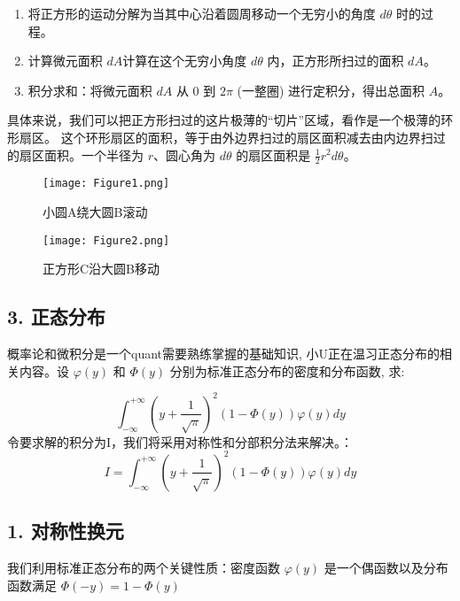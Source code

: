 \documentclass[UTF8]{ctexart}
\begin{document}
\begin{enumerate}
    \item 将正方形的运动分解为当其中心沿着圆周移动一个无穷小的角度 $d\theta$ 时的过程。
    \item 计算微元面积 $dA$计算在这个无穷小角度 $d\theta$ 内，正方形所扫过的面积 $dA$。
    \item 积分求和：将微元面积 $dA$ 从 $0$ 到 $2\pi$ (一整圈) 进行定积分，得出总面积 $A$。
\end{enumerate}
具体来说，我们可以把正方形扫过的这片极薄的“切片”区域，看作是一个极薄的环形扇区。
这个环形扇区的面积，等于由外边界扫过的扇区面积减去由内边界扫过的扇区面积。一个半径为 $r$、圆心角为 $d\theta$ 的扇区面积是 $\frac{1}{2}r^2 d\theta$。


\begin{figure}[h!]
    \centering
    \begin{minipage}{0.45\textwidth}
        \centering
        \texttt{[image: Figure1.png]} 
        \caption{小圆A绕大圆B滚动}
        \label{fig:fig1}
    \end{minipage}\hfill
    \begin{minipage}{0.45\textwidth}
        \centering
        \texttt{[image: Figure2.png]}
        \caption{正方形C沿大圆B移动}
        \label{fig:fig2}
    \end{minipage}
\end{figure}


\subsection*{3. 正态分布}
概率论和微积分是一个quant需要熟练掌握的基础知识, 小U正在温习正态分布的相关内容。设 $\varphi(y)$ 和 $\Phi(y)$ 分别为标准正态分布的密度和分布函数, 求:

$$\int_{-\infty}^{+\infty}{\left(y+\frac{1}{\sqrt{\pi}}\right)^{2}(1-\Phi(y))\varphi
  (y)dy}$$
令要求解的积分为I，我们将采用对称性和分部积分法来解决。：
$$ I = \int_{-\infty}^{+\infty}{\left(y+\frac{1}{\sqrt{\pi}}\right)^{2}(1-\Phi(y))\varphi(y)dy} $$

\subsection*{1. 对称性换元}
我们利用标准正态分布的两个关键性质：密度函数 $\varphi(y)$ 是一个偶函数以及分布函数满足 $\Phi(-y) = 1 - \Phi(y)$
\end{document}
